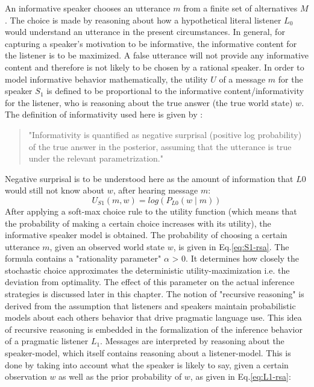 An informative speaker chooses an utterance $m$ from a finite set of alternatives $M$. The choice is made by reasoning about how a hypothetical literal listener $L_0$ would understand an utterance in the present circumstances.
In general, for capturing a speaker's motivation to be informative, the informative content for the listener is to be maximized. A false utterance will not provide any informative content and therefore is not likely to be chosen by a rational speaker. In order to model informative behavior mathematically, the utility $U$ of a message $m$ for the speaker $S_1$ is defined to be proportional to the informative content/informativity for the listener, who is reasoning about the true answer (the true world state) $w$.
The definition of informativity used here is given by \cite{lassiter2013context}:\begin{quote}
"Informativity is quantified as negative surprisal (positive log probability) of the true answer in the posterior, assuming that the utterance is true under the relevant parametrization."
\end{quote}
Negative surprisal is to be understood here as the amount of information that $L0$ would still not know about $w$, after hearing message $m$:
\begin{equation}
U_{S1}(m, w) = log(P_{L0}(w \mid m))
\end{equation}
After applying a soft-max choice rule to the utility function (which means that the probability of making a certain choice increases with its utility), the informative speaker model is obtained. The probability of choosing a certain utterance $m$, given an observed world state $w$, is given in Eq.\ref{eq:S1-rsa}.
The formula contains a "rationality parameter" $\alpha$ > 0. It determines how closely the stochastic choice approximates the deterministic utility-maximization i.e. the deviation from optimality. The effect of this parameter on the actual inference strategies is discussed later in this chapter. The notion of "recursive reasoning" is derived from the assumption that listeners and speakers maintain probabilistic models about each others behavior that drive pragmatic language use.
This idea of recursive reasoning is embedded in the formalization of the inference behavior of a pragmatic listener $L_1$. Messages are interpreted by reasoning about the speaker-model, which itself contains reasoning about a listener-model. This is done by taking into account what the speaker is likely to say, given a certain observation $w$ as well as the prior probability of $w$, as given in Eq.\ref{eq:L1-rsa}:
